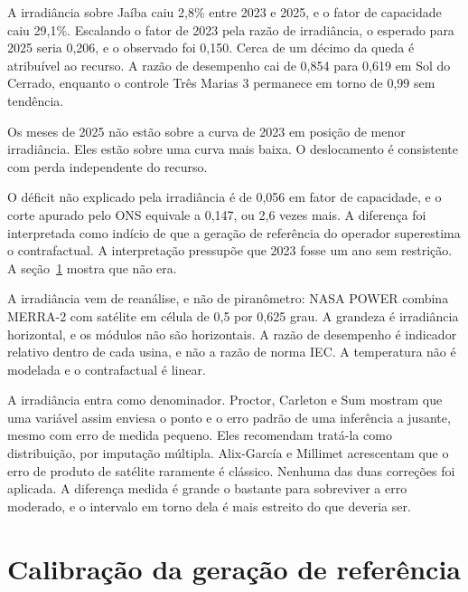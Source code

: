 A irradiância sobre Jaíba caiu 2,8\% entre 2023 e 2025, e o fator de capacidade
caiu 29,1\%. Escalando o fator de 2023 pela razão de irradiância, o esperado
para 2025 seria 0,206, e o observado foi 0,150. Cerca de um décimo da queda é
atribuível ao recurso. A razão de desempenho cai de 0,854 para 0,619 em Sol do
Cerrado, enquanto o controle Três Marias 3 permanece em torno de 0,99 sem
tendência.


Os meses de 2025 não estão sobre a curva de 2023 em posição de menor
irradiância. Eles estão sobre uma curva mais baixa. O deslocamento é consistente
com perda independente do recurso.

 O déficit não explicado
pela irradiância é de 0,056 em fator de capacidade, e o corte apurado pelo ONS
equivale a 0,147, ou 2,6 vezes mais. A diferença foi interpretada como indício
de que a geração de referência do operador superestima o contrafactual. A
interpretação pressupõe que 2023 fosse um ano sem restrição. A
seção~\ref{sec:fig6} mostra que não era.

\begin{objecao}
A irradiância vem de reanálise, e não de piranômetro: NASA POWER combina MERRA-2
com satélite em célula de 0,5 por 0,625 grau. A grandeza é irradiância
horizontal, e os módulos não são horizontais. A razão de desempenho é indicador
relativo dentro de cada usina, e não a razão de norma IEC. A
temperatura não é modelada e o contrafactual é linear.
\end{objecao}

 A irradiância entra como
denominador. Proctor, Carleton e Sum \cite{proctor2023} mostram que uma variável
assim enviesa o ponto e o erro padrão de uma inferência a jusante, mesmo com
erro de medida pequeno. Eles recomendam tratá-la como distribuição, por
imputação múltipla. Alix-García e Millimet \cite{alixgarcia2023} acrescentam que o erro de
produto de satélite raramente é clássico. Nenhuma das duas correções foi
aplicada. A diferença medida é grande o bastante para sobreviver a erro
moderado, e o intervalo em torno dela é mais estreito do que deveria ser.

\section{Calibração da geração de referência}
\label{sec:fig6}

